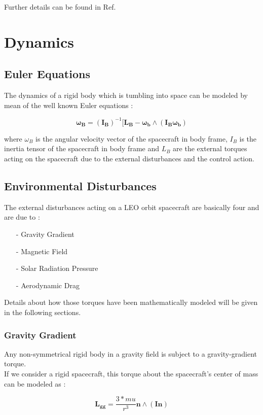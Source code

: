 \documentclass[11pt,a4paper]{report}
\begin{document}
Further details can be found in Ref. \cite{notes:bigss}
\section{Dynamics}
\subsection{Euler Equations}
The dynamics of a rigid body which is tumbling into space can be modeled by mean of the well known Euler equations : 

\begin{equation}
  \mathbf{\omega_B} = \mathbf{(I_B)}^{-1} [\mathbf{L_B} - \mathbf{\omega_b}  \wedge (\mathbf{I_B} \mathbf{\omega_b})
\end{equation}

where \textbf{$\omega_B$} is the angular velocity vector of the spacecraft in body frame, \textbf{$I_B$} is the inertia tensor of the spacecraft in body frame and \textbf{$L_B$} are the external torques acting on the spacecraft due to the external disturbances and the control action.

\subsection{Environmental Disturbances} \label{sec:disturbances}
The external disturbances acting on a LEO orbit spacecraft are basically four and are due to :

\begin{itemize}
  \item[-] Gravity Gradient
  \item[-] Magnetic Field 
  \item[-] Solar Radiation Pressure
  \item[-] Aerodynamic Drag
\end{itemize}

Details about how those torques have been mathematically modeled will be given in the following sections.

\subsubsection{Gravity Gradient}
Any non-symmetrical rigid body in a gravity field is subject to a gravity-gradient torque.\\
If we consider a rigid spacecraft, this torque about the spacecraft's center of mass can be modeled as :

\begin{equation}
 \mathbf{L_{gg}} = \frac{3*mu}{r^3} \mathbf{n} \wedge (\mathbf{I} \mathbf{n})
\end{equation}
\end{document}
